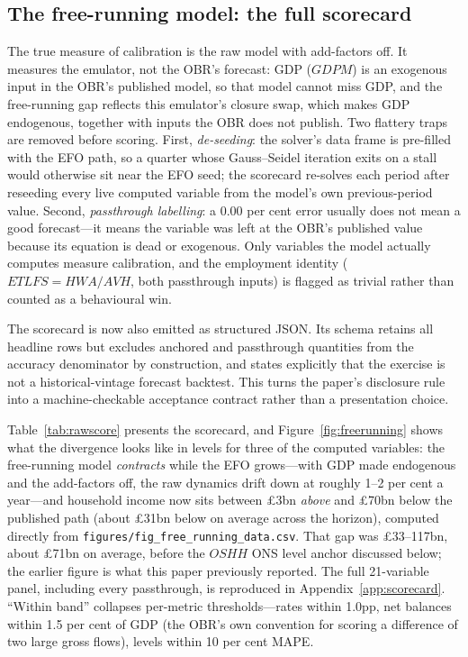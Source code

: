 \subsection{The free-running model: the full scorecard}
\label{sec:rawscore}

The true measure of calibration is the raw model with add-factors off. It measures the emulator, not the OBR's forecast: GDP ($GDPM$) is an exogenous input in the OBR's published model, so that model cannot miss GDP, and the free-running gap reflects this emulator's closure swap, which makes GDP endogenous, together with inputs the OBR does not publish. Two flattery traps are removed before scoring. First, \emph{de-seeding}: the solver's data frame is pre-filled with the EFO path, so a quarter whose Gauss--Seidel iteration exits on a stall would otherwise sit near the EFO seed; the scorecard re-solves each period after reseeding every live computed variable from the model's own previous-period value. Second, \emph{passthrough labelling}: a 0.00 per cent error usually does not mean a good forecast---it means the variable was left at the OBR's published value because its equation is dead or exogenous. Only variables the model actually computes measure calibration, and the employment identity ($ETLFS = HWA/AVH$, both passthrough inputs) is flagged as trivial rather than counted as a behavioural win.

The scorecard is now also emitted as structured JSON. Its schema retains all
headline rows but excludes anchored and passthrough quantities from the accuracy
denominator by construction, and states explicitly that the exercise is not a
historical-vintage forecast backtest. This turns the paper's disclosure rule
into a machine-checkable acceptance contract rather than a presentation choice.

Table~\ref{tab:rawscore} presents the scorecard, and Figure~\ref{fig:freerunning} shows what the divergence looks like in levels for three of the computed variables: the free-running model \emph{contracts} while the EFO grows---with GDP made endogenous and the add-factors off, the raw dynamics drift down at roughly 1--2 per cent a year---and household income now sits between \pounds 3bn \emph{above} and \pounds 70bn below the published path (about \pounds 31bn below on average across the horizon), computed directly from \texttt{figures/fig\_free\_running\_data.csv}. That gap was \pounds 33--117bn, about \pounds 71bn on average, before the $OSHH$ ONS level anchor discussed below; the earlier figure is what this paper previously reported. The full 21-variable panel, including every passthrough, is reproduced in Appendix~\ref{app:scorecard}. ``Within band'' collapses per-metric thresholds---rates within 1.0pp, net balances within 1.5 per cent of GDP (the OBR's own convention for scoring a difference of two large gross flows), levels within 10 per cent MAPE.

